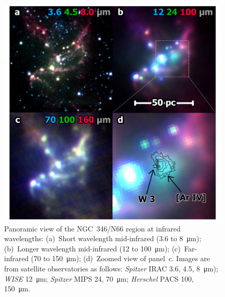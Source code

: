 \documentclass[twocolumn, times]{aastex631}
\begin{document}
\begin{figure}
  \centering
  \includegraphics[width=\linewidth]{figs/ngc346-infrared-multipanel}
  \caption{
    Panoramic view of the NGC~346/N66 region at infrared wavelengths:
    (a)~Short wavelength mid-infrared (\num{3.6} to \SI{8}{\um});
    (b)~Longer wavelength mid-infrared (\num{12} to \SI{100}{\um});
    (c)~Far-infrared (\num{70} to \SI{150}{\um});
    (d)~Zoomed view of panel~c.
    Images are from satellite observatories as follows:
    \textit{Spitzer} IRAC \num{3.6}, \num{4.5}, \SI{8}{\um});
    \textit{WISE} \SI{12}{\um};
    \textit{Spitzer} MIPS \num{24}, \SI{70}{\um};
    \textit{Herschel} PACS \num{100}, \SI{150}{\um}.
    }
  \label{fig:infrared-multipanel}
\end{figure}
\end{document}
